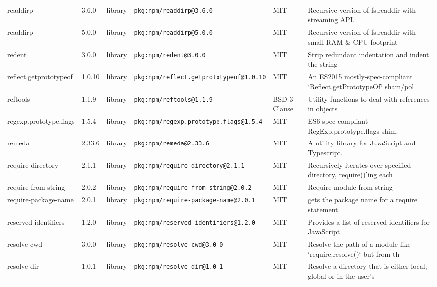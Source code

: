 \documentclass[11pt,a4paper]{article}
\begin{document}
\begin{longtable}{|p{4cm}|p{2cm}|p{1.6cm}|p{5cm}|p{1.5cm}|p{3.5cm}|}
\raggedright readdirp & 3.6.0 & library & \small\texttt{pkg:npm/readdirp@3.6.0} & MIT & \small Recursive version of fs.readdir with streaming API. \\
\raggedright readdirp & 5.0.0 & library & \small\texttt{pkg:npm/readdirp@5.0.0} & MIT & \small Recursive version of fs.readdir with small RAM \& CPU footprint \\
\raggedright redent & 3.0.0 & library & \small\texttt{pkg:npm/redent@3.0.0} & MIT & \small Strip redundant indentation and indent the string \\
\raggedright reflect.getprototypeof & 1.0.10 & library & \small\texttt{pkg:npm/reflect.getprototypeof@1.0.10} & MIT & \small An ES2015 mostly-spec-compliant `Reflect.getPrototypeOf` sham/pol \\
\raggedright reftools & 1.1.9 & library & \small\texttt{pkg:npm/reftools@1.1.9} & BSD-3-Clause & \small Utility functions to deal with references in objects \\
\raggedright regexp.prototype.flags & 1.5.4 & library & \small\texttt{pkg:npm/regexp.prototype.flags@1.5.4} & MIT & \small ES6 spec-compliant RegExp.prototype.flags shim. \\
\raggedright remeda & 2.33.6 & library & \small\texttt{pkg:npm/remeda@2.33.6} & MIT & \small A utility library for JavaScript and Typescript. \\
\raggedright require-directory & 2.1.1 & library & \small\texttt{pkg:npm/require-directory@2.1.1} & MIT & \small Recursively iterates over specified directory, require()'ing each \\
\raggedright require-from-string & 2.0.2 & library & \small\texttt{pkg:npm/require-from-string@2.0.2} & MIT & \small Require module from string \\
\raggedright require-package-name & 2.0.1 & library & \small\texttt{pkg:npm/require-package-name@2.0.1} & MIT & \small gets the package name for a require statement \\
\raggedright reserved-identifiers & 1.2.0 & library & \small\texttt{pkg:npm/reserved-identifiers@1.2.0} & MIT & \small Provides a list of reserved identifiers for JavaScript \\
\raggedright resolve-cwd & 3.0.0 & library & \small\texttt{pkg:npm/resolve-cwd@3.0.0} & MIT & \small Resolve the path of a module like `require.resolve()` but from th \\
\raggedright resolve-dir & 1.0.1 & library & \small\texttt{pkg:npm/resolve-dir@1.0.1} & MIT & \small Resolve a directory that is either local, global or in the user's \\

\end{longtable}
\end{document}
